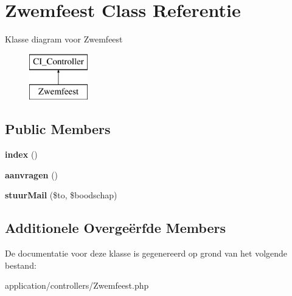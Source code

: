 \hypertarget{class_zwemfeest}{}\section{Zwemfeest Class Referentie}
\label{class_zwemfeest}
Klasse diagram voor Zwemfeest\begin{figure}[H]
\begin{center}
\leavevmode
\includegraphics[height=2.000000cm]{class_zwemfeest}
\end{center}
\end{figure}
\subsection*{Public Members}
\begin{DoxyCompactItemize}
\item 
\mbox{\label{class_zwemfeest_a149eb92716c1084a935e04a8d95f7347}} 
{\bfseries index} ()
\item 
\mbox{\label{class_zwemfeest_a953b261918e6b87c64f1badad661fe35}} 
{\bfseries aanvragen} ()
\item 
\mbox{\label{class_zwemfeest_a85794c1504032a0ac766ef6504845d2d}} 
{\bfseries stuur\+Mail} (\$to, \$boodschap)
\end{DoxyCompactItemize}
\subsection*{Additionele Overge\"{e}rfde Members}


De documentatie voor deze klasse is gegenereerd op grond van het volgende bestand\+:\begin{DoxyCompactItemize}
\item 
application/controllers/Zwemfeest.\+php\end{DoxyCompactItemize}
